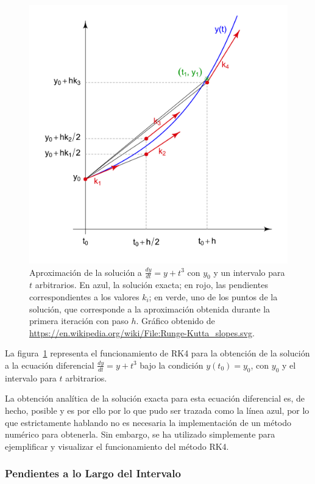\documentclass[12pt, a4paper]{article}
\begin{document}
\begin{figure}[H]\label{fig:slopes}
	\centering
	\includegraphics[scale=0.6]{../auxiliary/assets/Runge-Kutta_slopes.png}
	\caption{Aproximación de la solución a \(\frac{dy}{dt} = y + t^{3}\) con \(y_{0}\) y un intervalo para \(t\) arbitrarios. En azul, la solución exacta; en rojo, las pendientes correspondientes a los valores \(k_{i}\); en verde, uno de los puntos de la solución, que corresponde a la aproximación obtenida durante la primera iteración con paso \(h\). Gráfico obtenido de \url{https://en.wikipedia.org/wiki/File:Runge-Kutta_slopes.svg}.}
\end{figure}
La figura~\ref{fig:slopes} representa el funcionamiento de RK4 para la obtención de la solución a la ecuación diferencial \(\frac{dy}{dt} = y + t^{3}\) bajo la condición \(y(t_{0}) = y_{0}\), con \(y_{0}\) y el intervalo para \(t\) arbitrarios.

La obtención analítica de la solución exacta para esta ecuación diferencial es, de hecho, posible y es por ello por lo que pudo ser trazada como la línea azul, por lo que estrictamente hablando no es necesaria la implementación de un método numérico para obtenerla. Sin embargo, se ha utilizado simplemente para ejemplificar y visualizar el funcionamiento del método RK4.

\subsubsection{Pendientes a lo Largo del Intervalo}
\end{document}
